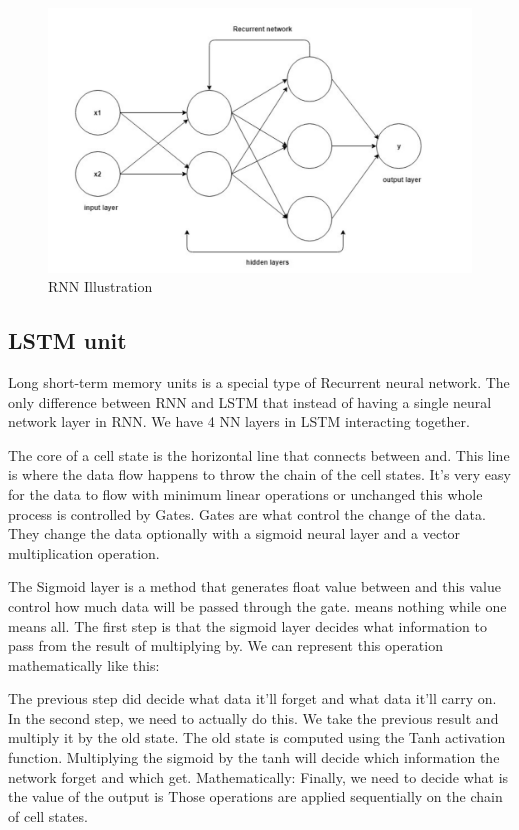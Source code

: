 \begin{figure}[ht]
    \centering
    \includegraphics[scale=0.3]{Images/recurrent-nets.png}
    \caption{RNN Illustration}
    \label{fig:rnnI}
\end{figure}

\subsection{LSTM unit}

Long short-term memory units is a special type of Recurrent neural network. The only difference between RNN and LSTM that instead of having a single neural network layer in RNN. We have 4 NN layers in LSTM interacting together.

The core of a cell state is the horizontal line that connects between and. This line is where the data flow happens to throw the chain of the cell states. It’s very easy for the data to flow with minimum linear operations or unchanged this whole process is controlled by Gates.
Gates are what control the change of the data. They change the data optionally with a sigmoid neural layer and a vector multiplication operation.

The Sigmoid layer is a method that generates float value between and this value control how much data will be passed through the gate. means nothing while one means all.
The first step is that the sigmoid layer decides what information to pass from the result of multiplying by. We can represent this operation mathematically like this:

The previous step did decide what data it’ll forget and what data it’ll carry on. In the second step, we need to actually do this.
We take the previous result and multiply it by the old state.
The old state is computed using the Tanh activation function. Multiplying the sigmoid by the tanh will decide which information the network forget and which get. Mathematically:
Finally, we need to decide what is the value of the output is
Those operations are applied sequentially on the chain of cell states.

